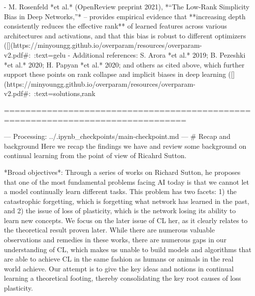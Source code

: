 - M. Rosenfeld *et al.* (OpenReview preprint 2021), *“The Low-Rank Simplicity Bias in Deep Networks,”* – provides empirical evidence that **increasing depth consistently reduces the effective rank** of learned features across various architectures and activations, and that this bias is robust to different optimizers ([](https://minyoungg.github.io/overparam/resources/overparam-v2.pdf#:~:text=gelu%
- Additional references: S. Arora *et al.* 2019; B. Pezeshki *et al.* 2020; H. Papyan *et al.* 2020; and others as cited above, which further support these points on rank collapse and implicit biases in deep learning ([](https://minyoungg.github.io/overparam/resources/overparam-v2.pdf#:~:text=solutions,rank%

================================================================================

--- Processing: ../.ipynb_checkpoints/main-checkpoint.md ---
# Recap and background
Here we recap the findings we have and review some background on  continual learning from the point of view of Ricahrd Sutton. 


*Broad objectives*: Through a series of works on Richard Sutton, he proposes that one of the most fundamental problems facing AI today is that we cannot let a model continually learn different tasks. This problem has two facets: 1) the catastrophic forgetting, which is forgetting what network has learned in the past, and 2) the issue of loss of plasticity, which is the network losing its ability to learn new concepts. We focus on the later issue of CL her, as it clearly relates to the theoretical result proven later. While there are numerous valuable observations and remedies in these works, there are numerous gaps in our understanding of CL, which makes us unable to build models and algorithms that are able to achieve CL in the same fashion as humans or animals in the real world achieve. Our attempt is to give the key ideas and notions in continual learning a theoretical footing, thereby consolidating the key root causes of loss plasticity. 

